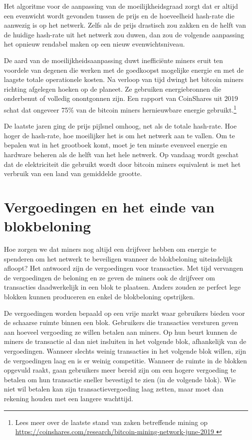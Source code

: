 Het algoritme voor de aanpassing van de moeilijkheidsgraad zorgt dat er altijd een evenwicht wordt gevonden tussen de prijs en de hoeveelheid hash-rate die aanwezig is op het netwerk. Zelfs als de prijs drastisch zou zakken en de helft van de huidige hash-rate uit het netwerk zou duwen, dan zou de volgende aanpassing het opnieuw rendabel maken op een nieuw evenwichtsniveau.

De aard van de moeilijkheidsaanpassing duwt inefficiënte miners eruit ten voordele van degenen die werken met de goedkoopst mogelijke energie en met de laagste totale operationele kosten. Na verloop van tijd dwingt het bitcoin miners richting afgelegen hoeken op de planeet. Ze gebruiken energiebronnen die onderbenut of volledig onontgonnen zijn. Een rapport van CoinShares uit 2019 schat dat ongeveer 75\% van de bitcoin miners hernieuwbare energie gebruikt.\footnote{Lees meer over de laatste stand van zaken betreffende mining op \href{https://coinshares.com/research/bitcoin-mining-network-june-2019 }{https://coinshares.com/research/bitcoin-mining-network-june-2019 }}

De laatste jaren ging de prijs pijlsnel omhoog, net als de totale hash-rate. Hoe hoger de hash-rate, hoe moeilijker het is om het netwerk aan te vallen. Om te bepalen wat in het grootboek komt, moet je ten minste evenveel energie en hardware beheren als de helft van het hele netwerk. Op vandaag wordt geschat dat de elektriciteit die gebruikt wordt door bitcoin miners equivalent is met het verbruik van een land van gemiddelde grootte.

\section{Vergoedingen en het einde van blokbeloning}

Hoe zorgen we dat miners nog altijd een drijfveer hebben om energie te spenderen om het netwerk te beveiligen wanneer de blokbeloning uiteindelijk afloopt? Het antwoord zijn de vergoedingen voor transacties. Met tijd vervangen de vergoedingen de beloning en ze geven de miners ook de drijfveer om transacties daadwerkelijk in een blok te plaatsen. Anders zouden ze perfect lege blokken kunnen produceren en enkel de blokbeloning opstrijken.

De vergoedingen worden bepaald op een vrije markt waar gebruikers bieden voor de schaarse ruimte binnen een blok. Gebruikers die transacties versturen geven aan hoeveel vergoeding ze willen betalen aan miners. Op hun beurt kunnen de miners de transactie al dan niet insluiten in het volgende blok, afhankelijk van de vergoedingen. Wanneer slechts weinig transacties in het volgende blok willen, zijn de vergoedingen laag en is er weinig competitie. Wanneer de ruimte in de blokken opgevuld raakt, gaan gebruikers meer bereid zijn om een hogere vergoeding te betalen om hun transactie sneller bevestigd te zien (in de volgende blok). Wie niet wil betalen kan zijn transactievergoeding laag zetten, maar moet dan rekening houden met een langere wachttijd.

